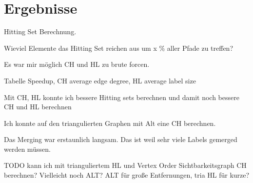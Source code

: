 \chapter{Ergebnisse}

Hitting Set Berechnung.


Wieviel Elemente das Hitting Set reichen aus um x \% aller Pfade zu treffen?


Es war mir möglich CH und HL zu brute forcen.

Tabelle Speedup, CH average edge degree, HL average label size

Mit CH, HL konnte ich bessere Hitting sets berechnen und damit noch bessere CH und HL  berechnen



Ich konnte auf den triangulierten Graphen mit Alt eine CH berechnen.



Das Merging war erstaunlich langsam. Das ist weil sehr viele Labels gemerged werden müssen.


TODO kann ich mit trianguliertem HL und Vertex Order Sichtbarkeitsgraph CH berechnen?
Vielleicht noch ALT? ALT für große Entfernungen, tria HL für kurze?
